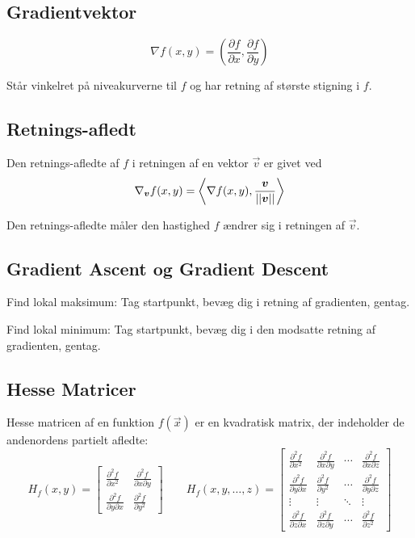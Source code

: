 \subsection{Gradientvektor}
\[
\nabla f (x,y) = \left( \frac{\partial f}{\partial x}, \frac{\partial f}{\partial y} \right)
\]

Står vinkelret på niveakurverne til $f$ og har retning af største stigning i $f$.


\subsection{Retnings-afledt}
Den retnings-afledte af $f$ i retningen af en vektor $\vec v$ er givet ved
\[
\nabla_{\boldsymbol{v}} f(x,y) = \left \langle \nabla f(x,y), \frac{\boldsymbol{v}}{||\boldsymbol{v}||} \right \rangle
\]

Den retnings-afledte måler den hastighed $f$ ændrer sig i retningen af $\vec v$.

\subsection{Gradient Ascent og Gradient Descent}
Find lokal maksimum: Tag startpunkt, bevæg dig i retning af gradienten, gentag.

Find lokal minimum: Tag startpunkt, bevæg dig i den modsatte retning af gradienten, gentag.

\subsection{Hesse Matricer}
\label{sec:HesseMatricer}
Hesse matricen af en funktion $f(\vec x)$ er en kvadratisk matrix, der indeholder de andenordens partielt afledte:
\begingroup
\renewcommand*{\arraystretch}{1.5}
\[
    H_f(x,y) = \begin{bmatrix}
        \frac{\partial^2 f}{\partial x^2} & \frac{\partial^2 f}{\partial x \partial y} \\
        \frac{\partial^2 f}{\partial y \partial x} & \frac{\partial^2 f}{\partial y^2}
    \end{bmatrix}
    \qquad
    H_f(x,y,\ldots,z) = \begin{bmatrix}
        \frac{\partial^2 f}{\partial x^2} & \frac{\partial^2 f}{\partial x \partial y} & \cdots & \frac{\partial^2 f}{\partial x \partial z} \\
        \frac{\partial^2 f}{\partial y \partial x} & \frac{\partial^2 f}{\partial y^2} & \cdots & \frac{\partial^2 f}{\partial y \partial z} \\
        \vdots & \vdots & \ddots & \vdots \\
        \frac{\partial^2 f}{\partial z \partial x} & \frac{\partial^2 f}{\partial z \partial y} & \cdots & \frac{\partial^2 f}{\partial z^2}
    \end{bmatrix}
\]
\endgroup


